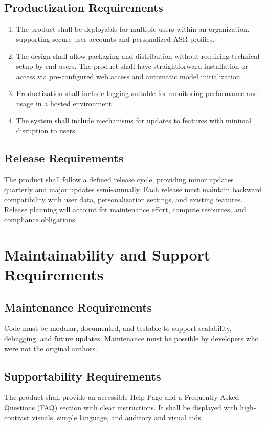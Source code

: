 \documentclass[12pt]{article}
\begin{document}
\subsection{Productization Requirements}
\begin{enumerate}
    \item The product shall be deployable for multiple users within an organization, supporting secure user accounts and personalized ASR profiles.
    \item The design shall allow packaging and distribution without requiring technical setup by end users. The product shall have straightforward installation or access via pre-configured web access and automatic model initialization.
    \item Productization shall include logging suitable for monitoring performance and usage in a hosted environment.
    \item The system shall include mechanisms for updates to features with minimal disruption to users.
\end{enumerate}
\subsection{Release Requirements}
The product shall follow a defined release cycle, providing minor updates quarterly and major updates semi-annually. Each release must maintain backward compatibility with user data, personalization settings, and existing features. Release planning will account for maintenance effort, compute resources, and compliance obligations.

\section{Maintainability and Support Requirements}
\subsection{Maintenance Requirements}
Code must be modular, documented, and testable to support scalability, debugging, and future updates. Maintenance must be possible by developers who were not the original authors. 
\subsection{Supportability Requirements}
The product shall provide an accessible Help Page and a Frequently Asked Questions (FAQ) section with clear instructions. It shall be displayed with high-contrast visuals, simple language, and auditory and visual aids. 
\end{document}
